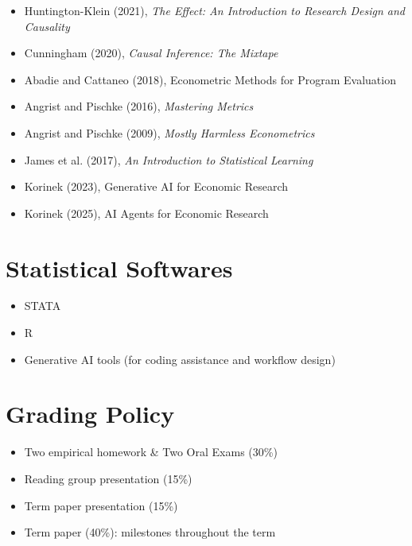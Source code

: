 \documentclass[11pt]{article}
\begin{document}
\begin{itemize}
\item Huntington-Klein (2021), \textit{The Effect: An Introduction to Research Design and Causality}
\item Cunningham (2020), \textit{Causal Inference: The Mixtape}
\item Abadie and Cattaneo (2018), Econometric Methods for Program Evaluation
\item Angrist and Pischke (2016), \textit{Mastering Metrics}
\item Angrist and Pischke (2009), \textit{Mostly Harmless Econometrics}
\item James et al. (2017), \textit{An Introduction to Statistical Learning}
\item Korinek (2023), Generative AI for Economic Research
\item Korinek (2025), AI Agents for Economic Research
\end{itemize}

\section*{Statistical Softwares}

\begin{itemize}
\item STATA
\item R
\item Generative AI tools (for coding assistance and workflow design)
\end{itemize}

\section*{Grading Policy}

\begin{itemize}
\item Two empirical homework \& Two Oral Exams (30\%)
\item Reading group presentation (15\%)
\item Term paper presentation (15\%)
\item Term paper (40\%): milestones throughout the term
\end{itemize}

\end{document}
